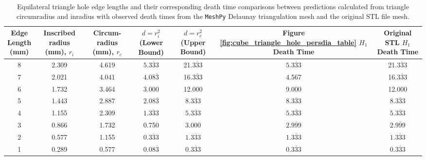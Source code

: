 \documentclass[ma]{uncgdissertationexp}
\theoremstyle{plain}
\theoremstyle{definition}
\theoremstyle{remark}
\begin{document}
\begin{table}[H]
\centering
\begin{tabular}{|c|c|c|c|c|c|c|}
    \hline
    \makecell{Edge\\Length\\(mm)} & 
    \makecell{Inscribed\\ radius\\ (mm), $r_{i}$} &     
    \makecell{Circum-\\radius\\(mm), $r_{c}$} & 
    \makecell{$d=r_{i}^{2}$\\(Lower\\Bound)} & 
    \makecell{$d=r_{c}^{2}$\\(Upper\\Bound)} & 
    \makecell{Figure \ref{fig:cube_triangle_hole_persdia_table}\\$H_1$ Death\\ Time} & 
    \makecell{Original STL\\$H_{1}$ Death\\Time}\\
    \hline
    8     & 2.309 & 4.619 & $5.\overline{333}$ & 21.$\overline{333}$ & $5.\overline{333}$ & 21.$\overline{333}$\\
    7     & 2.021 & 4.041 & $4.08\overline{3}$ & 16.$\overline{333}$ & 4.567              & 16.$\overline{333}$\\
    6     & 1.732 & 3.464 & 3.000              & 12.000              & 9.000              & 12.000\\
    5     & 1.443 & 2.887 & $2.08\overline{3}$ & 8.$\overline{333}$  & $8.\overline{333}$ & 8.$\overline{333}$\\
    4     & 1.155 & 2.309 & $1.\overline{333}$ & $5.\overline{333}$  & $5.\overline{333}$ & $5.\overline{333}$\\
    3     & 0.866 & 1.732 & 0.750              & 3.000               & $2.\overline{999}$ & $2.\overline{999}$\\
    2     & 0.577 & 1.155 & $0.\overline{333}$ & $1.\overline{333}$  & $1.\overline{333}$ & $1.\overline{333}$\\
    1     & 0.289 & 0.577 & $0.08\overline{3}$ & $0.\overline{333}$  & $0.\overline{333}$ & $0.\overline{333}$\\
    \hline
\end{tabular}
\cprotect\caption[Equilateral triangle hole edge lengths and death time comparisons.]{Equilateral triangle hole edge lengths and their corresponding death time comparisons between predictions calculated from triangle circumradius and inradius with observed death times from the \verb"MeshPy" Delaunay triangulation mesh and the original STL file mesh.}
\label{tab:eq_tri_hole_table}
\end{table}
\end{document}
